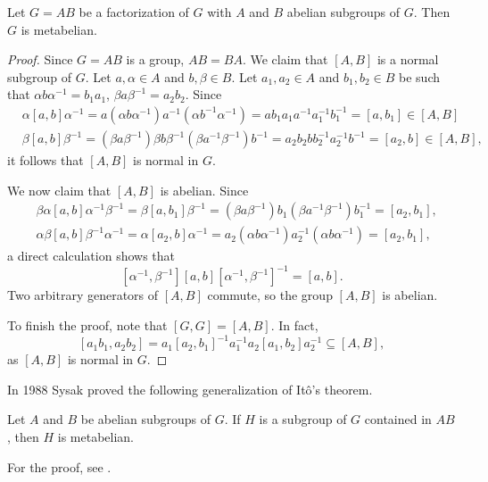 \begin{theorem}[It\^o]
\label{thm:Ito}
Let $G=AB$ be a factorization of $G$ with $A$ and $B$ abelian 
subgroups of $G$. Then $G$ is metabelian.
\end{theorem}

\begin{proof}
Since $G=AB$ is a group, $AB=BA$. We claim that $[A,B]$ is a normal subgroup 
of $G$. Let $a,\alpha\in A$ and $b,\beta\in B$. Let  $a_1,a_2\in A$ and 
	$b_1,b_2\in B$ be such that $\alpha b\alpha^{-1}=b_1a_1$, $\beta
	a\beta^{-1}=a_2b_2$. Since 
	\begin{align*}
		&\alpha[a,b]\alpha^{-1}=a(\alpha b\alpha^{-1})a^{-1}(\alpha b^{-1}\alpha^{-1})=ab_1a_1a^{-1}a_1^{-1}b_1^{-1}=[a,b_1]\in [A,B]\\
		&\beta[a,b]\beta^{-1}=(\beta a\beta^{-1})\beta b\beta^{-1}(\beta a^{-1}\beta^{-1})b^{-1}=a_2b_2bb_2^{-1}a_2^{-1}b^{-1}=[a_2,b]\in [A,B],
	\end{align*}
	it follows that $[A,B]$ is normal in $G$. 

	We now claim that $[A,B]$ is abelian. Since 
	\begin{align*}
		&\beta\alpha[a,b]\alpha^{-1}\beta^{-1} = \beta[a,b_1]\beta^{-1}=(\beta a\beta^{-1})b_1(\beta a^{-1}\beta^{-1})b_1^{-1}=[a_2,b_1],\\
		&\alpha\beta[a,b]\beta^{-1}\alpha^{-1} = \alpha[a_2,b]\alpha^{-1}=a_2(\alpha b\alpha^{-1})a_2^{-1}(\alpha b\alpha^{-1})=[a_2,b_1],
	\end{align*}
	a direct calculation shows that 
	\[
		[\alpha^{-1},\beta^{-1}][a,b][\alpha^{-1},\beta^{-1}]^{-1}=[a,b].
	\]
	Two arbitrary generators of $[A,B]$ commute, so the group $[A,B]$ is abelian. 
	
	To finish the proof, note that $[G,G]=[A,B]$. In fact, 
	\[
	[a_1b_1,a_2b_2]=a_1[a_2,b_1]^{-1}a_1^{-1}a_2[a_1,b_2]a_2^{-1}\subseteq [A,B],
	\]
	as $[A,B]$ is normal in $G$. 
\end{proof}

In 1988 Sysak proved the following generalization 
of It\^o's theorem.  

\begin{theorem}[Sysak]
\label{thm:Sysak}
    Let $A$ and $B$ be abelian subgroups of $G$. If $H$ is a subgroup of 
    $G$ contained in 
    $AB$, then $H$ is metabelian. 
\end{theorem}

For the proof, see \cite{MR988177}.


